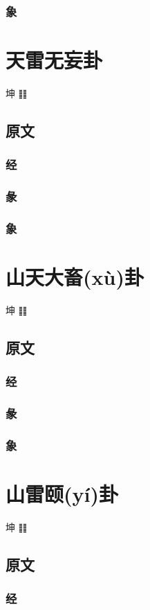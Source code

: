 \documentclass[12pt,oneside]{book}
\begin{document}
\subsection{象}


\chapter{天雷无妄卦}
坤 ䷁

\section{原文}
\subsection{经}
\subsection{彖}
\subsection{象}


\chapter{山天大畜(xù)卦}
坤 ䷁

\section{原文}
\subsection{经}
\subsection{彖}
\subsection{象}


\chapter{山雷颐(yí)卦}
坤 ䷁

\section{原文}
\subsection{经}
\end{document}
